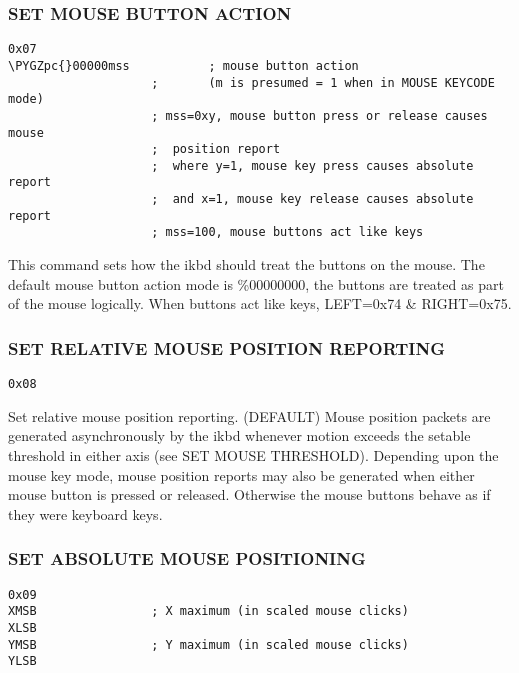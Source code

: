 \documentclass[a4paper,8pt,english]{sphinxmanual}
\def\PYGZpc{\char`\%}
\begin{document}
\subsubsection{SET MOUSE BUTTON ACTION}
\label{input/devices/atarikbd:set-mouse-button-action}
\begin{Verbatim}[commandchars=\\\{\}]
0x07
\PYGZpc{}00000mss           ; mouse button action
                    ;       (m is presumed = 1 when in MOUSE KEYCODE mode)
                    ; mss=0xy, mouse button press or release causes mouse
                    ;  position report
                    ;  where y=1, mouse key press causes absolute report
                    ;  and x=1, mouse key release causes absolute report
                    ; mss=100, mouse buttons act like keys
\end{Verbatim}

This command sets how the ikbd should treat the buttons on the mouse. The
default mouse button action mode is \%00000000, the buttons are treated as part
of the mouse logically.
When buttons act like keys, LEFT=0x74 \& RIGHT=0x75.


\subsubsection{SET RELATIVE MOUSE POSITION REPORTING}
\label{input/devices/atarikbd:set-relative-mouse-position-reporting}
\begin{Verbatim}[commandchars=\\\{\}]
0x08
\end{Verbatim}

Set relative mouse position reporting. (DEFAULT) Mouse position packets are
generated asynchronously by the ikbd whenever motion exceeds the setable
threshold in either axis (see SET MOUSE THRESHOLD). Depending upon the mouse
key mode, mouse position reports may also be generated when either mouse
button is pressed or released. Otherwise the mouse buttons behave as if they
were keyboard keys.


\subsubsection{SET ABSOLUTE MOUSE POSITIONING}
\label{input/devices/atarikbd:set-absolute-mouse-positioning}
\begin{Verbatim}[commandchars=\\\{\}]
0x09
XMSB                ; X maximum (in scaled mouse clicks)
XLSB
YMSB                ; Y maximum (in scaled mouse clicks)
YLSB
\end{Verbatim}
\end{document}
